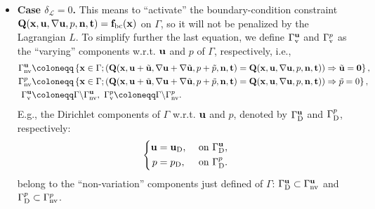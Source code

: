 \documentclass[oneside,11pt]{book}
\numberwithin{equation}{section}
\begin{document}
\begin{itemize}[leftmargin=0in]
    \item \textbf{Case $\delta_{\mathcal{L}} = 0$.} This means to ``activate'' the boundary-condition constraint ${\bf Q}({\bf x},{\bf u},\nabla{\bf u},p,{\bf n},{\bf t}) = {\bf f}_{\rm bc}({\bf x})$ on $\Gamma$, so it will not be penalized by the Lagrangian $L$. To simplify further the last equation, we define $\Gamma_{\rm v}^{\bf u}$ and $\Gamma_{\rm v}^p$ as the ``varying'' components w.r.t. ${\bf u}$ and $p$ of $\Gamma$, respectively, i.e.,
    \begin{align*}
        \Gamma_{\rm nv}^{\bf u} &\coloneqq\left\{{\bf x}\in\Gamma;\left({\bf Q}({\bf x},{\bf u} + \tilde{\bf u},\nabla{\bf u} + \nabla\tilde{\bf u},p + \tilde{p},{\bf n},{\bf t}) = {\bf Q}({\bf x},{\bf u},\nabla{\bf u},p,{\bf n},{\bf t})\right)\Rightarrow\tilde{\bf u} = {\bf 0}\right\},\\
        \Gamma_{\rm nv}^p &\coloneqq\left\{{\bf x}\in\Gamma;\left({\bf Q}({\bf x},{\bf u} + \tilde{\bf u},\nabla{\bf u} + \nabla\tilde{\bf u},p + \tilde{p},{\bf n},{\bf t}) = {\bf Q}({\bf x},{\bf u},\nabla{\bf u},p,{\bf n},{\bf t})\right)\Rightarrow\tilde{p} = 0\right\},\\
        \Gamma_{\rm v}^{\bf u} &\coloneqq\Gamma\backslash\Gamma_{\rm nv}^{\bf u},\ \Gamma_{\rm v}^p\coloneqq\Gamma\backslash\Gamma_{\rm nv}^p.
    \end{align*}
    E.g., the Dirichlet components of $\Gamma$ w.r.t. ${\bf u}$ and $p$, denoted by $\Gamma_{\rm D}^{\bf u}$ and $\Gamma_{\rm D}^p$, respectively:
    \begin{equation*}
        \left\{\begin{split}
            {\bf u} &= {\bf u}_{\rm D},&&\mbox{ on } \Gamma_{\rm D}^{\bf u},\\
            p &= p_{\rm D},&&\mbox{ on } \Gamma_{\rm D}^p.
        \end{split}\right.
    \end{equation*}
    belong to the ``non-variation'' components just defined of $\Gamma$: $\Gamma_{\rm D}^{\bf u}\subset\Gamma_{\rm nv}^{\bf u}$ and $\Gamma_{\rm D}^p\subset\Gamma_{\rm nv}^p$.
    

\end{itemize}
\end{document}
